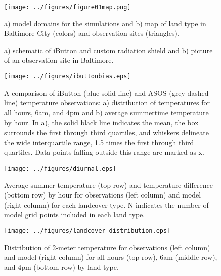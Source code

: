 \documentclass[draft,linenumbers]{agujournal}
\begin{document}
%
%
%
%
\begin{figure}[h]
\centering
\texttt{[image: ../figures/figure01map.png]}
\caption{a) model domains for the simulations and b) map of land type in Baltimore City (colors) and observation sites (triangles).}
\label{fig:map}
 \end{figure}
 
 \begin{figure}[h]
\centering
\caption{a) schematic of iButton and custom radiation shield and b) picture of an observation site in Baltimore.}
\label{fig:ibutton}
 \end{figure}
 
\begin{figure}[h]
\centering
\texttt{[image: ../figures/ibuttonbias.eps]}
\caption{A comparison of iButton (blue solid line) and ASOS (grey dashed line) temperature observations: a) distribution of temperatures for all hours,  6am, and 4pm and b) average summertime temperature by hour. In a), the solid black line indicates the mean, the box surrounds the first through third quartiles, and whiskers delineate the wide interquartile range, 1.5 times the first through third quartiles. Data points falling outside this range are marked as x. }
\label{fig:bias}
\end{figure}

\begin{figure}[h]
\centering
\texttt{[image: ../figures/diurnal.eps]}
\caption{Average summer temperature (top row) and temperature difference (bottom row) by hour for observations (left column) and model (right column) for each landcover type. N indicates the number of model grid points included in each land type. }
\label{fig:diurnal}
\end{figure}

\begin{figure}[h]
\centering
\texttt{[image: ../figures/landcover\_distribution.eps]}
\caption{Distribution of 2-meter temperature for observations (left column) and model (right column) for all hours (top row), 6am (middle row), and 4pm (bottom row) by land type. }
\label{fig:hist}
\end{figure}
\end{document}
